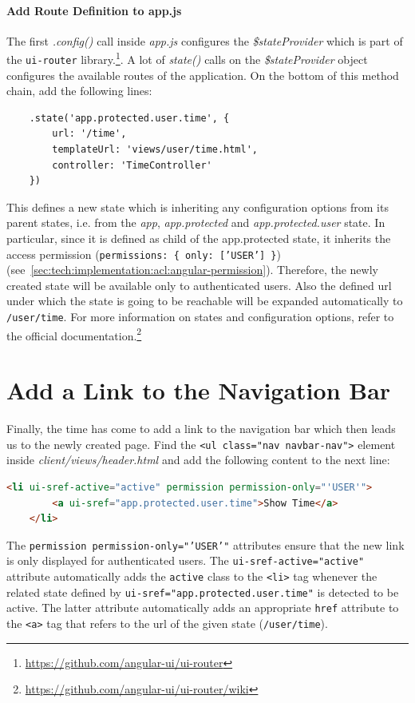 \documentclass[nochapterpage,nopartpage,noheadingspace,numbersubsubsec,bigchapter,colorback,accentcolor=tud9c,10pt]{tudreport}
\begin{document}
  \paragraph{Add Route Definition to app.js}
    The first \emph{.config()} call inside \emph{app.js} configures the \emph{\$stateProvider} which is part of the \texttt{ui-router} library.\footnote{\url{https://github.com/angular-ui/ui-router}}. A lot of \emph{state()} calls on the \emph{\$stateProvider} object configures the available routes of the application. On the bottom of this method chain, add the following lines:
        \begin{lstlisting}
    .state('app.protected.user.time', {
        url: '/time',
        templateUrl: 'views/user/time.html',
        controller: 'TimeController'
    })
        \end{lstlisting}
    This defines a new state which is inheriting any configuration options from its parent states, i.e. from the \emph{app}, \emph{app.protected} and \emph{app.protected.user} state. In particular, since it is defined as child of the app.protected state, it inherits the access permission (\texttt{permissions: \{ only: ['USER'] \}}) (see~\ref{sec:tech:implementation:acl:angular-permission}). Therefore, the newly created state will be available only to authenticated users. Also the defined url under which the state is going to be reachable will be expanded automatically to \texttt{/user/time}. For more information on states and configuration options, refer to the official documentation.\footnote{\url{https://github.com/angular-ui/ui-router/wiki}}

  \section{Add a Link to the Navigation Bar}
  \label{sec:tech:handson:navlink}

    Finally, the time has come to add a link to the navigation bar which then leads us to the newly created page. Find the \texttt{<ul class="nav navbar-nav">} element inside \emph{client/views/header.html} and add the following content to the next line:
        \begin{lstlisting}[language=html]
    <li ui-sref-active="active" permission permission-only="'USER'">
        <a ui-sref="app.protected.user.time">Show Time</a>
    </li>
        \end{lstlisting}
    The \texttt{permission permission-only="'USER'"} attributes ensure that the new link is only displayed for authenticated users. The \texttt{ui-sref-active="active"} attribute automatically adds the \texttt{active} class to the \texttt{<li>} tag whenever the related state defined by \texttt{ui-sref="app.protected.user.time"} is detected to be active. The latter attribute automatically adds an appropriate \texttt{href} attribute to the \texttt{<a>} tag that refers to the url of the given state (\texttt{/user/time}).
\end{document}
